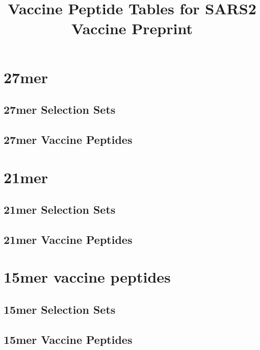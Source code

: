 \documentclass{article}
\title{Vaccine Peptide Tables for SARS2 Vaccine Preprint}
\begin{document}
\section{27mer}
\subsection{27mer Selection Sets}

\subsection{27mer Vaccine Peptides}


\section{21mer}
\subsection{21mer Selection Sets}

\subsection{21mer Vaccine Peptides}


\section{15mer vaccine peptides}
\subsection{15mer Selection Sets}

\subsection{15mer Vaccine Peptides}

\end{document}
